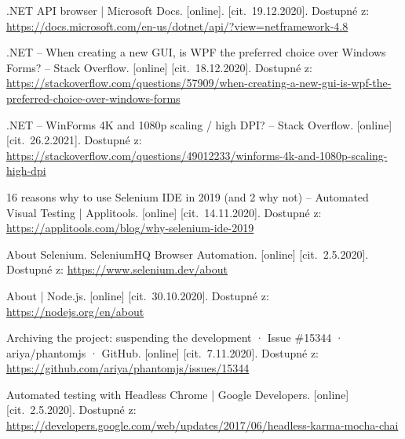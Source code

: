 \newpage
{}


\begin{flushleft}

\begin{thebibliography}{99}


 .NET API browser | Microsoft Docs. [online]. [cit.~19.12.2020]. Dostupné z: \url{https://docs.microsoft.com/en-us/dotnet/api/?view=netframework-4.8}

 .NET -- When creating a new GUI, is WPF the preferred choice over Windows Forms? -- Stack Overflow. [online] [cit.~18.12.2020]. Dostupné z: \url{https://stackoverflow.com/questions/57909/when-creating-a-new-gui-is-wpf-the-preferred-choice-over-windows-forms}

 .NET -- WinForms 4K and 1080p scaling / high DPI? -- Stack Overflow. [online] [cit.~26.2.2021]. Dostupné z: \url{https://stackoverflow.com/questions/49012233/winforms-4k-and-1080p-scaling-high-dpi}

 16 reasons why to use Selenium IDE in 2019 (and 2 why not) -- Automated Visual Testing | Applitools. [online] [cit.~14.11.2020]. Dostupné z: \url{https://applitools.com/blog/why-selenium-ide-2019}

 About Selenium. SeleniumHQ Browser Automation. [online] [cit.~2.5.2020]. Dostupné z: \url{https://www.selenium.dev/about}

 About | Node.js. [online] [cit.~30.10.2020]. Dostupné z: \url{https://nodejs.org/en/about}

 Archiving the project: suspending the development · Issue \#15344 · ariya/phan\-tomjs · GitHub. [online] [cit.~7.11.2020]. Dostupné z: \url{https://github.com/ariya/phantomjs/issues/15344}

 Automated testing with Headless Chrome | Google Developers. [online] [cit.~2.5.2020]. Dostupné z: \url{https://developers.google.com/web/updates/2017/06/headless-karma-mocha-chai}


\end{thebibliography}
\end{flushleft}
